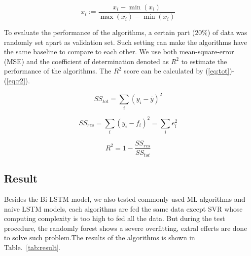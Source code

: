 \documentclass[conference, a4paper]{IEEEtran}
\begin{document}
    \begin{equation}
    x_i := \frac{x_i-\min \left( x_i \right)}{\max \left( x_i \right) -\min \left( x_i \right)}
    \label{eq:standarlize}
    \end{equation}

    To evaluate the performance of the algorithms, a certain part (20\%) of data was randomly set apart as validation set. Such setting can make the algorithms have the same baseline to compare to each other. We use both mean-square-error (MSE) and the coefficient of determination denoted as $R^2$ to estimate the performance of the algorithms. The $R^2$ score can be calculated by (\ref{eq:tot})-(\ref{eq:r2}).

    \begin{equation}
      SS_{tot} = \sum_{i}(y_i-\bar{y})^2
      \label{eq:tot}
    \end{equation}

    \begin{equation}
      SS_{res} = \sum_{i}(y_i-f_i)^2=\sum_ie_i^2
      \label{eq:res}
    \end{equation}

    \begin{equation}
      R^2 = 1-\frac{SS_{res}}{SS_{tot}}
      \label{eq:r2}
    \end{equation}



\subsection{Result}
  Besides the Bi-LSTM model, we also tested commonly used ML algorithms and naive LSTM models, each algorithms are fed the same data except SVR whose computing complexity is too high to fed all the data\cite{clarkeAnalysisSupportVector2005}. But during the test procedure, the randomly forest shows a severe overfitting, extral efferts are done to solve such problem.The results of the algorithms is shown in Table.~\ref{tab:result}.
\end{document}
